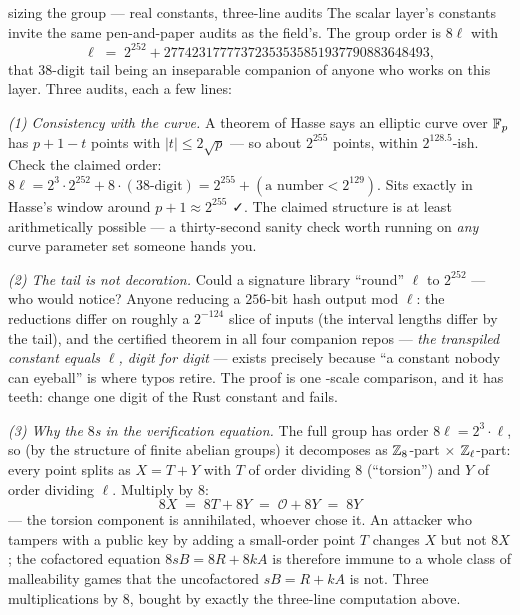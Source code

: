 \begin{worked}{sizing the group --- real constants, three-line audits}
The scalar layer's constants invite the same pen-and-paper audits as the
field's. The group order is $8\ell$ with
\[
\ell \;=\; 2^{252} + 27742317777372353535851937790883648493 ,
\]
that $38$-digit tail being an inseparable companion of anyone who works
on this layer. Three audits, each a few lines:

\emph{(1) Consistency with the curve.} A theorem of Hasse says an
elliptic curve over $\mathbb{F}_p$ has $p + 1 - t$ points with
$|t| \le 2\sqrt{p}$ --- so about $2^{255}$ points, within
$2^{128.5}$-ish. Check the claimed order:
$8\ell = 2^{3} \cdot 2^{252} + 8 \cdot (38\text{-digit}) =
2^{255} + (\text{a number} < 2^{129})$. Sits exactly in Hasse's window
around $p + 1 \approx 2^{255}$ ✓. The claimed structure is at least
arithmetically possible --- a thirty-second sanity check worth running on
\emph{any} curve parameter set someone hands you.

\emph{(2) The tail is not decoration.} Could a signature library
``round'' $\ell$ to $2^{252}$ --- who would notice? Anyone reducing a
$256$-bit hash output mod $\ell$: the reductions differ on roughly a
$2^{-124}$ slice of inputs (the interval lengths differ by the tail), and
the certified theorem  in all four companion repos ---
\emph{the transpiled constant equals $\ell$, digit for digit} --- exists
precisely because ``a constant nobody can eyeball'' is where typos
retire. The proof is one -scale comparison, and it has
teeth: change one digit of the Rust constant and 
fails.

\emph{(3) Why the $8$s in the verification equation.} The full group has
order $8\ell = 2^3 \cdot \ell$, so (by the structure of finite abelian
groups) it decomposes as $\mathbb{Z}_8$-part $\times$ $\mathbb{Z}_\ell$-part: every point
splits as $X = T + Y$ with $T$ of order dividing $8$ (``torsion'') and
$Y$ of order dividing $\ell$. Multiply by $8$:
\[
8X \;=\; 8T + 8Y \;=\; \mathcal{O} + 8Y \;=\; 8Y
\]
--- the torsion component is annihilated, whoever chose it. An attacker
who tampers with a public key by adding a small-order point $T$ changes
$X$ but not $8X$; the cofactored equation $8sB = 8R + 8kA$ is therefore
immune to a whole class of malleability games that the uncofactored
$sB = R + kA$ is not. Three multiplications by $8$, bought by exactly the
three-line computation above.
\end{worked}

